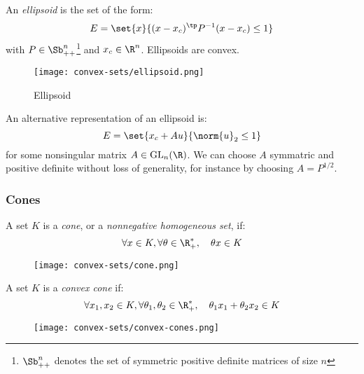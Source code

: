 \begin{definition}[Ellipsoid]
    An \emph{ellipsoid} is the set of the form:
    \begin{equation*}
        E = \set{x}{(x - x_c)^\tp P^{-1}(x - x_c)\leq 1}
    \end{equation*}
    with $P\in\Sb^n_{++}$\footnote{$\Sb^n_{++}$ denotes the set of symmetric positive definite matrices of size $n$} and $x_c\in\R^n$. Ellipsoids are convex.

    \begin{figure}[H]
        \centering
        \texttt{[image: convex-sets/ellipsoid.png]}
        \caption{Ellipsoid}
    \end{figure}

    An alternative representation of an ellipsoid is:
    \begin{equation*}
        E = \set{x_c + Au}{\norm{u}_2\leq 1}
    \end{equation*}
    for some nonsingular matrix $A\in\textnormal{GL}_n(\R)$. We can choose $A$ symmatric and positive definite without loss of generality, for instance by choosing $A = P^{1/2}$.
\end{definition}

\subsubsection{Cones}
\begin{definition}[Cones]
    A set $K$ is a \emph{cone}, or a \emph{nonnegative homogeneous set}, if:
    \begin{equation*}
        \forall x\in K, \forall \theta\in\R_+^*, \quad \theta x\in K
    \end{equation*}

    \begin{figure}[H]
        \centering
        \texttt{[image: convex-sets/cone.png]}
    \end{figure}
\end{definition}

\begin{definition}
    A set $K$ is a \emph{convex cone} if:
    \begin{equation*}
        \forall x_1, x_2\in K, \forall \theta_1, \theta_2\in\R_+^*, \quad \theta_1x_1 + \theta_2x_2\in K
    \end{equation*}

    \begin{figure}[H]
        \centering
        \texttt{[image: convex-sets/convex-cones.png]}
    \end{figure}
\end{definition}

